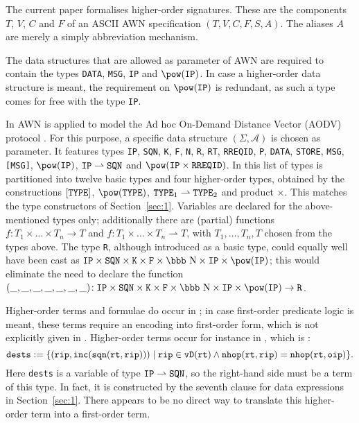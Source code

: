 \documentclass[adraft]{eptcs}
\newcommand{\IN}{\mbox{\bbb N}}                         %
\newcommand{\sect}[1]{Section~\ref{sec:#1}}
\newcommand{\aac}[1]{{\tt #1}}    %
\newcommand{\A}{{\mathcal{A}}}     %
\begin{document}
The current paper formalises higher-order signatures. 
These are the components $T$, $V$, $C$ and $F$ of an ASCII AWN specification  $(T,V,C,F,S,A)$.
The aliases $A$ are merely a simply abbreviation mechanism.

The data structures that are allowed as parameter of AWN are required to
contain the types \aac{DATA}, \aac{MSG}, \aac{IP} and $\pow(\aac{IP})$. In case a higher-order
data structure is meant, the requirement on $\pow(\aac{IP})$ is redundant, as such a type comes for free
with the type \aac{IP}.

In \cite{ESOP12,TR13} AWN is applied to model the Ad hoc On-Demand Distance Vector (AODV) protocol \cite{rfc3561}.
For this purpose, a specific data structure $(\Sigma,\A)$ is chosen as parameter. It features types
\aac{IP},  \aac{SQN},  \aac{K},  \aac{F},  \aac{\IN},  \aac{R},  \aac{RT},  \aac{RREQID},
\aac{P}, \aac{DATA},  \aac{STORE}, \aac{MSG},  \aac{[MSG]},  $\pow(\aac{IP})$,
$\aac{IP}\rightharpoonup \aac{SQN}$ and  $\pow(\aac{IP}\times\aac{RREQID})$.
In \cite{TR13} this list of types is partitioned into twelve basic types and four
higher-order types, obtained by the constructions $[\aac{TYPE}]$, $\pow(\aac{TYPE})$,
$\aac{TYPE}_1\rightharpoonup\aac{TYPE}_2$ and product $\times$. This matches the type constructors
of \sect{1}. Variables are declared for the above-mentioned types only;
additionally there are (partial) functions $f:T_1\times \dots \times T_n\rightarrow T$
and $f:T_1\times \dots \times T_n\rightharpoonup T$, with $T_1,\dots,T_n,T$ chosen from the types above.
The type \aac{R}, although introduced as a basic type, could equally well have been cast as
$\aac{IP} \times \aac{SQN} \times\aac{K} \times\aac{F} \times \IN \times \aac{IP} \times \pow(\aac{IP})$;
this would eliminate the need to declare the function $(\_,\_,\_,\_,\_,\_,\_)\!:
\aac{IP} \times \aac{SQN} \times\aac{K} \times\aac{F} \times \IN \times \aac{IP} \times \pow(\aac{IP})
\rightarrow \aac{R}$.

Higher-order terms and formulae do occur in \cite{ESOP12,TR13}; in case first-order
predicate logic is meant, these terms require an encoding into first-order form, which is not explicitly
given in \cite{ESOP12,TR13}.
Higher-order terms occur for instance in \cite[Process 1, Line 18]{ESOP12}, which is \cite[Process 5, Line 16]{TR13}:
\[\aac{dests}:=\{(\aac{rip},\aac{inc}(\aac{sqn}(\aac{rt},\aac{rip}))) \mid
  \aac{rip}\in\aac{vD}(\aac{rt}) \wedge \aac{nhop}(\aac{rt},\aac{rip}) =\aac{nhop}(\aac{rt},\aac{oip})\}.\]
Here \aac{dests} is a variable of type $\aac{IP}\rightharpoonup \aac{SQN}$, so the right-hand
side must be a term of this type. In fact, it is constructed by the seventh clause for data expressions in
\sect{1}. There appears to be no direct way to translate this higher-order term into
a first-order term.
\end{document}
